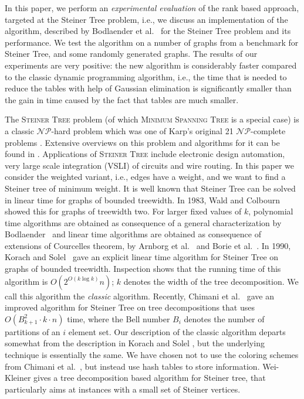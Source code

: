 \documentclass{llncs}
\begin{document}
In this paper, we perform an {\em experimental evaluation} of the rank based approach,
targeted at the {\sc Steiner Tree} problem, i.e., we discuss an implementation
of the algorithm, described by Bodlaender et al.~\cite{BodlaenderCKN12} for the
{\sc Steiner Tree} problem and its performance. We test the algorithm on
a number of graphs from a benchmark for Steiner Tree, and some randomly generated
graphs. The results of our experiments are very positive: the new algorithm is
considerably faster compared to the classic dynamic programming algorithm,
i.e., the time that is needed to reduce the tables with help of Gaussian elimination
is significantly smaller than the gain in time caused by the fact that tables are
much smaller.

The \textsc{Steiner Tree} problem (of which \textsc{Minimum Spanning Tree} is a special case) is a 
classic $\mathcal{NP}$-hard problem which was one of Karp's original 21 $\mathcal{NP}$-complete problems \cite{Karp72}. 
Extensive overviews on this problem and algorithms for it can be found in \cite{HwangRW92,Winter87}. 
Applications of \textsc{Steiner Tree} include electronic design automation, very large scale integration (VSLI) of circuits and wire routing. 
In this paper we consider the weighted variant, i.e., edges have a weight, and
we want to find a Steiner tree of minimum weight.
It is well known that {\sc Steiner Tree} can be solved in linear time for graphs of bounded treewidth. 
In 1983, Wald and Colbourn \cite{WaldC83} showed this for graphs of treewidth two. For larger fixed values of
$k$, polynomial time algorithms are obtained as consequence of a general characterization by Bodlaender~\cite{Bodlaender87} and linear time algorithms are obtained as consequence of extensions of Courcelles theorem,
by Arnborg et al.~\cite{ArnborgLS91} and Borie et al.~\cite{BoriePT92}. In 1990, Korach and Solel~\cite{KorachS90}
gave an explicit linear time algorithm for {\sc Steiner Tree} on graphs of bounded treewidth.
Inspection shows that the running time of this algorithm is $O(2^{O(k\log k)} n)$; $k$ denotes the width
of the tree decomposition. We call this
algorithm the {\em classic} algorithm. Recently, Chimani et al.~\cite{ChimaniMZ12} gave an improved
algorithm for {\sc Steiner Tree} on tree decompositions that uses $O(B^2_{k+1}\cdot k \cdot n)$ time,
where the Bell number $B_i$ denotes the number of partitions of an $i$ element set.
Our description of the classic algorithm departs somewhat from
the description in Korach and Solel \cite{KorachS90}, but the underlying technique is essentially the same.
We have chosen not to use the coloring schemes from Chimani et al.~\cite{ChimaniMZ12}, but instead 
use hash tables to store information.
Wei-Kleiner \cite{WeiKleiner13} gives a tree decomposition based algorithm for Steiner tree, that 
particularly aims at instances with a small set of Steiner vertices.
\end{document}
